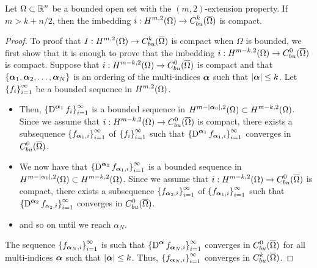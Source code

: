 \begin{cor} \label{sob_cor_sob_lem}
Let $\displaystyle \Omega \subset \mathbb{R}^n$ be a bounded open set with
the $(m,2)$-extension property. If $m>k +n/2$, then the imbedding
$\displaystyle i:H^{m,2}(\Omega) \to C_{bu}^k(\overline{\Omega})$
is compact.
\end{cor}

\begin{proof}
 To proof that $\displaystyle I: H^{m,2}(\Omega) \to
C^k_{bu}(\overline{\Omega})$ is compact when $\Omega$ is bounded, we first
show that it is enough to prove that the imbedding
$\displaystyle i: H^{m-k,2}(\Omega) \to C^0_{bu}(\overline{\Omega})$ is
compact. Suppose that
$\displaystyle i: H^{m-k,2}(\Omega) \to C_{bu}^0(\overline{\Omega})$
is compact and that $\{{\bm{\alpha}}_1 , {\bm{\alpha}}_2, \ldots,
{\bm{\alpha}}_N\}$ is an ordering of the multi-indices ${\bm{\alpha}}$ such
that $|{\bm{\alpha}}| \leq k$. 
Let $\displaystyle \left\{ f_i \right\}_{i=1}^\infty$ be a bounded
sequence in $\displaystyle H^{m,2}(\Omega)$.
\begin{itemize}
\item Then,
$\displaystyle \left\{ \operatorname{D}^{{\bm{\alpha}}_1} f_i \right\}_{i=1}^\infty$
is a bounded sequence in
$\displaystyle H^{m-|{\bm{\alpha}}_0|,2}(\Omega) \subset H^{m-k,2}(\Omega)$.
Since we assume that
$\displaystyle i: H^{m-k,2}(\Omega) \to C_{bu}^0(\overline{\Omega})$
is compact, there exists a subsequence
$\displaystyle \left\{ f_{{\bm{\alpha}}_1,i} \right\}_{i=1}^\infty$
of $\displaystyle \left\{ f_i \right\}_{i=1}^\infty$
such that
$\displaystyle \left\{ \operatorname{D}^{{\bm{\alpha}}_1} f_{{\bm{\alpha}}_1,i}
\right\}_{i=1}^\infty$
converges in $\displaystyle C_{bu}^0(\overline{\Omega})$.
\item We now have that
$\displaystyle \left\{ \operatorname{D}^{{\bm{\alpha}}_2} f_{{\bm{\alpha}}_1,i}
\right\}_{i=1}^\infty$ is
a bounded sequence in
$\displaystyle H^{m-|\alpha_1|,2}(\Omega) \subset H^{m-k,2}(\Omega)$.
Since we assume that
$\displaystyle i: H^{m-k,2}(\Omega) \to C_{bu}^0(\overline{\Omega})$
is compact, there exists a subsequence
$\displaystyle \left\{ f_{{\bm{\alpha}}_2,i} \right\}_{i=1}^\infty$
of $\displaystyle \left\{ f_{{\bm{\alpha}}_1,i} \right\}_{i=1}^\infty$
such that
$\displaystyle \left\{ \operatorname{D}^{{\bm{\alpha}}_2} f_{\alpha_2,i}
\right\}_{i=1}^\infty$
converges in $\displaystyle C_{bu}^0(\overline{\Omega})$.
\item and so on until we reach $\alpha_N$.
\end{itemize}
The sequence
$\displaystyle \left\{ f_{{\bm{\alpha}}_N,i} \right\}_{i=1}^\infty$ is such
that
$\displaystyle \left\{ \operatorname{D}^{{\bm{\alpha}}} f_{{\bm{\alpha}}_N,i}
\right\}_{i=1}^\infty$
converges in $\displaystyle C_{bu}^0(\overline{\Omega})$ for all
multi-indices ${\bm{\alpha}}$ such that $|{\bm{\alpha}}|\leq k$.  Thus,
$\displaystyle \left\{ f_{{\bm{\alpha}}_N,i} \right\}_{i=1}^\infty$
converges in $\displaystyle C_{bu}^k(\overline{\Omega})$.


\end{proof}
